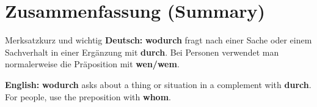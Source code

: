 \documentclass[a4paper,11pt]{article}
\newcommand{\GermanText}[1]{\textbf{Deutsch: }#1\par}
\newcommand{\EnglishText}[1]{{\small\color{SoftGray}\textbf{English: }#1\par}}
\begin{document}
\section{Zusammenfassung (Summary)}
\begin{grammarentry}{Merksatz}{kurz und wichtig}
\GermanText{\textbf{wodurch} fragt nach einer Sache oder einem Sachverhalt in einer Ergänzung mit \textbf{durch}. Bei Personen verwendet man normalerweise die Präposition mit \textbf{wen/wem}.}
\EnglishText{\textbf{wodurch} asks about a thing or situation in a complement with \textbf{durch}. For people, use the preposition with \textbf{whom}.}
\end{grammarentry}
\end{document}
